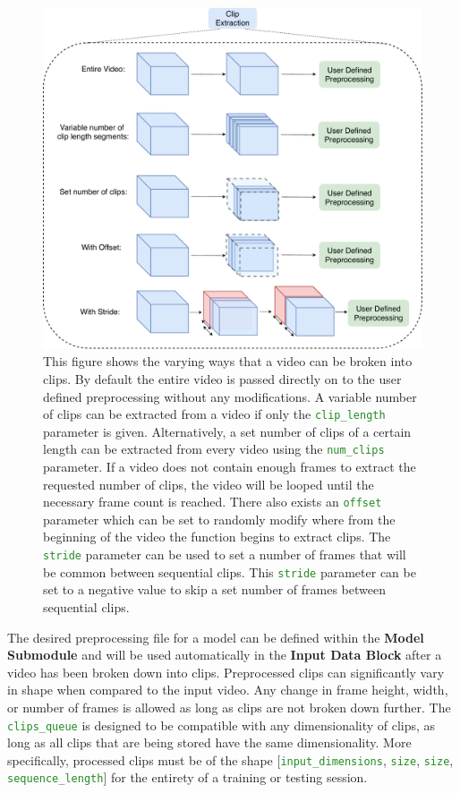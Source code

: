 \documentclass{llncs}
\begin{document}
\begin{figure}[b!]
\centering
\includegraphics[width=0.8\columnwidth]{images/extract_clips.pdf}
\caption{This figure shows the varying ways that a video can be broken into clips.
By default the entire video is passed directly on to the user defined preprocessing without any modifications.
A variable number of clips can be extracted from a video if only the \texttt{\textcolor{ForestGreen}{clip\_length}} parameter is given.
Alternatively, a set number of clips of a certain length can be extracted from every video using the \texttt{\textcolor{ForestGreen}{num\_clips}} parameter.
If a video does not contain enough frames to extract the requested number of clips, the video will be looped until the necessary frame count is reached.
There also exists an \texttt{\textcolor{ForestGreen}{offset}} parameter which can be set to randomly modify where from the beginning of the video the function begins to extract clips. 
The \texttt{\textcolor{ForestGreen}{stride}}  parameter can be used to set a number of frames that will be common between sequential clips.
This \texttt{\textcolor{ForestGreen}{stride}} parameter can be set to a negative value to skip a set number of frames between sequential clips.
}
\label{fig:extract_clips}
\end{figure}


The desired preprocessing file for a model can be defined within the \textbf{Model Submodule} and will be used automatically in the \textbf{Input Data Block} after a video has been broken down into clips.
Preprocessed clips can significantly vary in shape when compared to the input video.
Any change in frame height, width, or number of frames is allowed as long as clips are not broken down further.
The \texttt{\textcolor{ForestGreen}{clips\_queue}} is designed to be compatible with any dimensionality of clips, as long as all clips that are being stored have the same dimensionality.
More specifically, processed clips must be of the shape [\texttt{\textcolor{ForestGreen}{input\_dimensions}}, \texttt{\textcolor{ForestGreen}{size}}, \texttt{\textcolor{ForestGreen}{size}}, \texttt{\textcolor{ForestGreen}{sequence\_length}}] for the entirety of a training or testing session.
\end{document}
